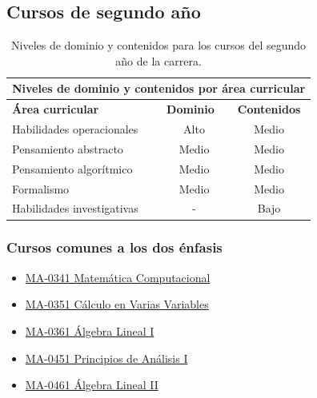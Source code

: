 \subsection{Cursos de segundo año}

\begin{table}[H]
\begin{center}
\begin{tabular}{|ccc|}
\hline
\multicolumn{3}{|c|}{\cellcolor[HTML]{00C0F3} \textbf{Niveles de dominio y contenidos por área curricular}} \\ \hline
\multicolumn{1}{|l|}{\cellcolor[HTML]{8ED8F8}\textbf{Área curricular}} & \multicolumn{1}{l|}{\cellcolor[HTML]{8ED8F8}\textbf{Dominio}} & \cellcolor[HTML]{8ED8F8}\textbf{Contenidos} \\ \hline
\multicolumn{1}{|l|}{Habilidades operacionales} & \multicolumn{1}{c|}{Alto} & Medio \\ \hline
\multicolumn{1}{|l|}{Pensamiento abstracto} & \multicolumn{1}{c|}{Medio} & Medio \\ \hline
\multicolumn{1}{|l|}{Pensamiento algorítmico} & \multicolumn{1}{c|}{Medio} & Medio \\ \hline
\multicolumn{1}{|l|}{Formalismo} & \multicolumn{1}{c|}{Medio} & Medio \\ \hline
\multicolumn{1}{|l|}{Habilidades investigativas} & \multicolumn{1}{c|}{-} & Bajo \\ \hline
\end{tabular}
\end{center}
\caption{Niveles de dominio y contenidos para los cursos del segundo año de la carrera.}
\end{table}

\subsubsection*{Cursos comunes a los dos énfasis}

\begin{itemize}
    \item \hyperlink{MA0341}{MA-0341 Matemática Computacional}
    \item \hyperlink{MA0351}{MA-0351 Cálculo en Varias Variables}
    \item \hyperlink{MA0361}{MA-0361 Álgebra Lineal I}
    \item \hyperlink{MA0451}{MA-0451 Principios de Análisis I}
    \item \hyperlink{MA0461}{MA-0461 Álgebra Lineal II}
\end{itemize}

